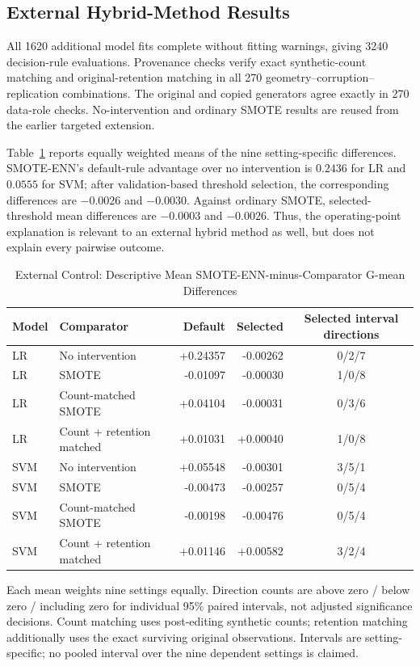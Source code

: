 \subsection{External Hybrid-Method Results}
\label{subsec:external_method_results}
All 1620 additional model fits complete without fitting warnings, giving 3240 decision-rule evaluations. Provenance checks verify exact synthetic-count matching and original-retention matching in all 270 geometry--corruption--replication combinations. The original and copied generators agree exactly in 270 data-role checks. No-intervention and ordinary SMOTE results are reused from the earlier targeted extension.

Table~\ref{tab:external_control_means} reports equally weighted means of the nine setting-specific differences. SMOTE-ENN's default-rule advantage over no intervention is $0.2436$ for LR and $0.0555$ for SVM; after validation-based threshold selection, the corresponding differences are $-0.0026$ and $-0.0030$. Against ordinary SMOTE, selected-threshold mean differences are $-0.0003$ and $-0.0026$. Thus, the operating-point explanation is relevant to an external hybrid method as well, but does not explain every pairwise outcome.

\begin{table}[t]
\caption{External Control: Descriptive Mean SMOTE-ENN-minus-Comparator G-mean Differences}
\label{tab:external_control_means}
\centering\small
\begin{tabular}{llrrc}
\hline
Model & Comparator & Default & Selected & Selected interval directions\\
\hline
LR & No intervention & +0.24357 & -0.00262 & 0/2/7 \\
LR & SMOTE & -0.01097 & -0.00030 & 1/0/8 \\
LR & Count-matched SMOTE & +0.04104 & -0.00031 & 0/3/6 \\
LR & Count + retention matched & +0.01031 & +0.00040 & 1/0/8 \\
SVM & No intervention & +0.05548 & -0.00301 & 3/5/1 \\
SVM & SMOTE & -0.00473 & -0.00257 & 0/5/4 \\
SVM & Count-matched SMOTE & -0.00198 & -0.00476 & 0/5/4 \\
SVM & Count + retention matched & +0.01146 & +0.00582 & 3/2/4 \\
\hline
\end{tabular}
\par\smallskip\footnotesize Each mean weights nine settings equally. Direction counts are above zero / below zero / including zero for individual 95\% paired intervals, not adjusted significance decisions. Count matching uses post-editing synthetic counts; retention matching additionally uses the exact surviving original observations. Intervals are setting-specific; no pooled interval over the nine dependent settings is claimed.
\end{table}

